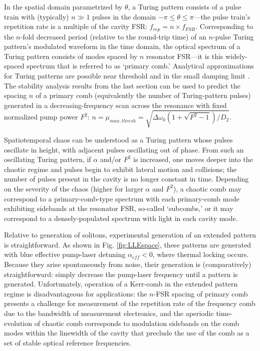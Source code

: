 {In the spatial domain parametrized by $\theta$, a Turing pattern consists of a pulse train with (typically) $n\gg1$ pulses in the domain $-\pi\leq\theta\leq\pi$---the pulse train's repetition rate is a multiple of the cavity FSR: $f_{rep}=n\times f_{FSR}$. Corresponding to the $n$-fold decreased period (relative to the round-trip time) of an $n$-pulse Turing pattern's modulated waveform in the time domain, the optical spectrum of a Turing pattern consists of modes spaced by $n$ resonator FSR---it is this widely-spaced spectrum that is referred to as `primary comb.'  Analytical approximations for Turing patterns are possible near threshold \cite{Lugiato1987,Lugiato1987a} and in the small damping limit \cite{Renninger2016}. The stability analysis results from the last section can be used to predict the spacing $n$ of a primary comb (equivalently the number of Turing-pattern pulses) generated in a decreasing-frequency scan across the resonance with fixed normalized pump power $F^2$: $n=\mu_{max,thresh}=\sqrt{\Delta\omega_0(1+\sqrt{F^2-1})/D_2}$.

Spatiotemporal chaos can be understood as a Turing pattern whose pulses oscillate in height, with adjacent pulses oscillating out of phase. From such an oscillating Turing pattern, if $\alpha$ and/or $F^2$ is increased, one moves deeper into the chaotic regime and pulses begin to exhibit lateral motion and collisions; the number of pulses present in the cavity is no longer constant in time. Depending on the severity of the chaos (higher for larger $\alpha$ and $F^2$), a chaotic comb may correspond to a primary-comb-type spectrum with each primary-comb mode exhibiting sidebands at the resonator FSR, so-called `subcombs,' or it may correspond to a densely-populated spectrum with light in each cavity mode.

Relative to generation of solitons, experimental generation of an extended pattern is straightforward. As shown in Fig. \ref{fig:LLEspace}, these patterns are generated with blue effective pump-laser detuning $\alpha_{eff}<0$, where thermal locking occurs. Because they arise spontaneously from noise, their generation is (comparatively) straightforward: simply decrease the pump-laser frequency until a pattern is generated. Unfortunately, operation of a Kerr-comb in the extended pattern regime is disadvantageous for applications: the $n$-FSR spacing of primary comb presents a challenge for measurement of the repetition rate of the frequency comb due to the bandwidth of measurement electronics, and the aperiodic time-evolution of chaotic comb corresponds to modulation sidebands on the comb modes within the linewidth of the cavity that preclude the use of the comb as a set of stable optical reference frequencies. 

}
